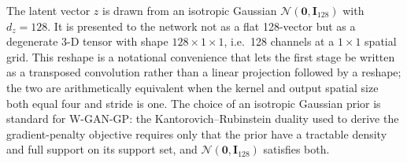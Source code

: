 
The latent vector $z$ is drawn from an isotropic Gaussian
$\mathcal{N}(\mathbf{0}, \mathbf{I}_{128})$ with $d_z = 128$. It is
presented to the network not as a flat 128-vector but as a degenerate
3-D tensor with shape $128 \times 1 \times 1$, i.e.\ 128 channels at a
$1 \times 1$ spatial grid. This reshape is a notational convenience that
lets the first stage be written as a transposed convolution rather than a
linear projection followed by a reshape; the two are arithmetically
equivalent when the kernel and output spatial size both equal four and
stride is one. The choice of an isotropic Gaussian prior is standard for
W-GAN-GP: the Kantorovich--Rubinstein duality used to derive the
gradient-penalty objective requires only that the prior have a tractable
density and full support on its support set, and
$\mathcal{N}(\mathbf{0}, \mathbf{I}_{128})$ satisfies both.
